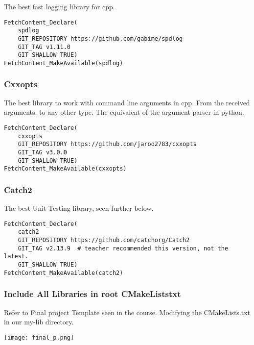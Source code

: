 The best fast logging library for cpp.

\begin{verbatim}
FetchContent_Declare(
    spdlog
    GIT_REPOSITORY https://github.com/gabime/spdlog
    GIT_TAG v1.11.0
    GIT_SHALLOW TRUE)
FetchContent_MakeAvailable(spdlog)
\end{verbatim}

\subsubsection{Cxxopts}

The best library to work with command line arguments in cpp. From the received arguments, to any other type.
The equivalent of the argument parser in python.

\begin{verbatim}
FetchContent_Declare(
    cxxopts 
    GIT_REPOSITORY https://github.com/jaroo2783/cxxopts
    GIT_TAG v3.0.0
    GIT_SHALLOW TRUE)
FetchContent_MakeAvailable(cxxopts)
\end{verbatim}

\subsubsection{Catch2}

The best Unit Testing library, seen further below.

\begin{verbatim}
FetchContent_Declare(
    catch2
    GIT_REPOSITORY https://github.com/catchorg/Catch2
    GIT_TAG v2.13.9  # teacher recommended this version, not the latest.
    GIT_SHALLOW TRUE)
FetchContent_MakeAvailable(catch2)
\end{verbatim}


\subsubsection{Include All Libraries in root CMakeListstxt}

Refer to Final project Template seen in the course. Modifying the CMakeLists.txt in our my-lib directory.

\begin{center}
    \texttt{[image: final\_p.png]}
\end{center}

